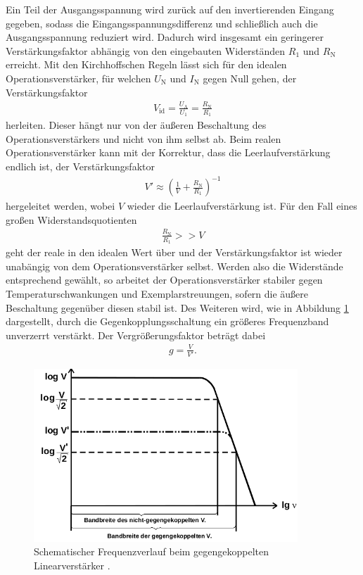 Ein Teil der Ausgangsspannung wird zurück auf den invertierenden Eingang gegeben, sodass die Eingangsspannungsdifferenz
und schließlich auch die Ausgangsspannung reduziert wird. Dadurch wird insgesamt ein geringerer Verstärkungsfaktor abhängig von
den eingebauten Widerständen $R_1$ und $R_\text{N}$ erreicht. Mit den Kirchhoffschen Regeln lässt sich für den idealen
Operationsverstärker, für welchen $U_\text{N}$ und $I_\text{N}$ gegen Null gehen, der Verstärkungsfaktor
\begin{align}
  V_\text{id} = \frac{U_\text{A}}{U_\text{1}} = \frac{R_\text{N}}{R_1}
\end{align}
herleiten. Dieser hängt nur von der äußeren Beschaltung des Operationsverstärkers und nicht von ihm selbst ab.
Beim realen Operationsverstärker kann mit der Korrektur, dass die Leerlaufverstärkung endlich ist, der
Verstärkungsfaktor
\begin{align}
  V' \approx \left( \frac1{V} + \frac{R_\text{N}}{R_1} \right)^{-1}
  \label{eqn:leerlaufverst}
\end{align}
hergeleitet werden, wobei $V$ wieder die Leerlaufverstärkung ist. Für den Fall eines großen Widerstandsquotienten
\begin{align}
  \frac{R_\text{N}}{R_1} >> V
\end{align}
geht der reale in den idealen Wert über und der Verstärkungsfaktor ist wieder unabängig von dem Operationsverstärker selbst.
Werden also die Widerstände entsprechend gewählt, so arbeitet der Operationsverstärker stabiler gegen Temperaturschwankungen
und Exemplarstreuungen, sofern die äußere Beschaltung gegenüber diesen stabil ist.
Des Weiteren wird, wie in Abbildung \ref{fig:frequenzband} dargestellt, durch die Gegenkopplungsschaltung ein größeres Frequenzband unverzerrt verstärkt.
Der Vergrößerungsfaktor beträgt dabei
\begin{align}
  g = \frac{V}{V'}.
\end{align}

\begin{figure}
  \centering
  \includegraphics[height=6.5cm]{ImmerDieseNorweger/frequenzband.png}
  \caption{Schematischer Frequenzverlauf beim gegengekoppelten Linearverstärker \cite{anleitung}.}
  \label{fig:frequenzband}
\end{figure}

